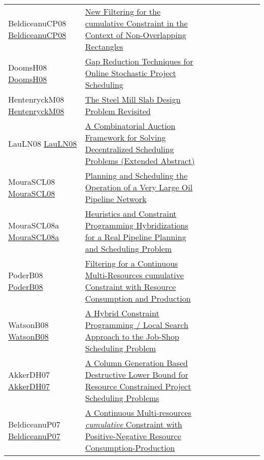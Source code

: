 {\begin{longtable}{p{3cm}p{7cm}lllllll}
BeldiceanuCP08 \href{https://doi.org/10.1007/978-3-540-68155-7\_5}{BeldiceanuCP08} &  \href{papers/BeldiceanuCP08.pdf}{New Filtering for the cumulative Constraint in the Context of Non-Overlapping Rectangles} &  &  &  &  &  &  & \\
DoomsH08 \href{https://doi.org/10.1007/978-3-540-68155-7\_8}{DoomsH08} &  \href{papers/DoomsH08.pdf}{Gap Reduction Techniques for Online Stochastic Project Scheduling} &  &  &  &  &  &  & \\
HentenryckM08 \href{https://doi.org/10.1007/978-3-540-68155-7\_41}{HentenryckM08} &  \href{papers/HentenryckM08.pdf}{The Steel Mill Slab Design Problem Revisited} &  &  &  &  &  &  & \\
LauLN08 \href{https://doi.org/10.1007/978-3-540-68155-7\_33}{LauLN08} &  \href{papers/LauLN08.pdf}{A Combinatorial Auction Framework for Solving Decentralized Scheduling Problems (Extended Abstract)} &  &  &  &  &  &  & \\
MouraSCL08 \href{https://doi.org/10.1007/978-3-540-85958-1\_3}{MouraSCL08} &  \href{papers/MouraSCL08.pdf}{Planning and Scheduling the Operation of a Very Large Oil Pipeline Network} &  &  &  &  &  &  & \\
MouraSCL08a \href{https://doi.org/10.1109/CSE.2008.24}{MouraSCL08a} &  \href{papers/MouraSCL08a.pdf}{Heuristics and Constraint Programming Hybridizations for a Real Pipeline Planning and Scheduling Problem} &  &  &  &  &  &  & \\
PoderB08 \href{http://www.aaai.org/Library/ICAPS/2008/icaps08-033.php}{PoderB08} &  \href{papers/PoderB08.pdf}{Filtering for a Continuous Multi-Resources cumulative Constraint with Resource Consumption and Production} &  &  &  &  &  &  & \\
WatsonB08 \href{https://doi.org/10.1007/978-3-540-68155-7\_21}{WatsonB08} &  \href{papers/WatsonB08.pdf}{A Hybrid Constraint Programming / Local Search Approach to the Job-Shop Scheduling Problem} &  &  &  &  &  &  & \\
AkkerDH07 \href{https://doi.org/10.1007/978-3-540-72397-4\_27}{AkkerDH07} &  \href{papers/AkkerDH07.pdf}{A Column Generation Based Destructive Lower Bound for Resource Constrained Project Scheduling Problems} &  &  &  &  &  &  & \\
BeldiceanuP07 \href{https://doi.org/10.1007/978-3-540-72397-4\_16}{BeldiceanuP07} &  \href{papers/BeldiceanuP07.pdf}{A Continuous Multi-resources \emph{cumulative} Constraint with Positive-Negative Resource Consumption-Production} &  &  &  &  &  &  & \\

\end{longtable}}
